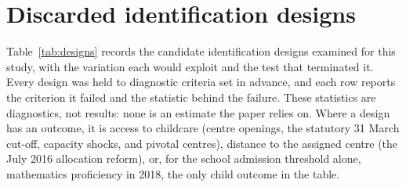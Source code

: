 
\section{Discarded identification designs}
\label{sec:appendix-designs}
Table~\ref{tab:designs} records the candidate identification designs examined for this study, with the variation each would exploit and the test that terminated it. Every design was held to diagnostic criteria set in advance, and each row reports the criterion it failed and the statistic behind the failure. These statistics are diagnostics, not results: none is an estimate the paper relies on. Where a design has an outcome, it is access to childcare (centre openings, the statutory 31 March cut-off, capacity shocks, and pivotal centres), distance to the assigned centre (the July 2016 allocation reform), or, for the school admission threshold alone, mathematics proficiency in 2018, the only child outcome in the table.

